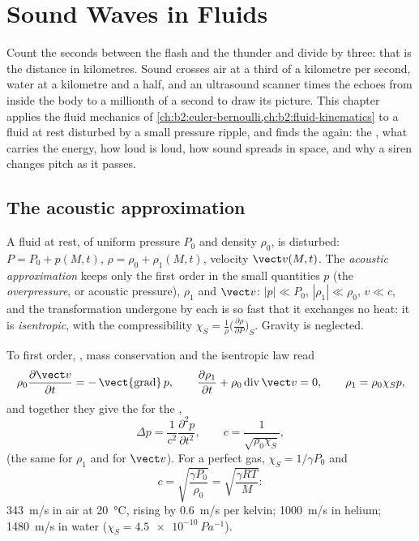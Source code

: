 \chapter{Sound Waves in Fluids}\label{ch:b2:sound-waves}

Count the seconds between the flash and the thunder and divide by
three: that is the distance in kilometres. Sound crosses air at a
third of a kilometre per second, water at a kilometre and a half, and
an ultrasound scanner times the echoes from inside the body to a
millionth of a second to draw its picture. This chapter applies the
fluid mechanics of \cref{ch:b2:euler-bernoulli,ch:b2:fluid-kinematics}
to a fluid at rest disturbed by a small pressure ripple, and finds the
 again: the , what carries the
energy, how loud is loud, how sound spreads in space, and why a siren
changes pitch as it passes.

\section{The acoustic approximation}

\begin{definition}\label{def:b2:sound-waves:approximation}
A fluid at rest, of uniform pressure $P_0$ and density $\rho_0$, is
disturbed: $P = P_0 + p(M, t)$, $\rho = \rho_0 + \rho_1(M, t)$, velocity
$\vect v(M, t)$. The \emph{acoustic approximation} keeps only the first
order in the small quantities $p$ (the \emph{overpressure}, or acoustic
pressure), $\rho_1$ and $\vect v$: $|p| \ll P_0$, $|\rho_1| \ll \rho_0$, $v \ll c$,
and the transformation undergone by each  is so fast
that it exchanges no heat: it is \emph{isentropic}, with the
compressibility $\chi_S = \frac1\rho\bigl(\frac{\partial\rho}{\partial P}\bigr)_S$.
Gravity is neglected.
\end{definition}

\begin{theorem}\label{thm:b2:sound-waves:equation}
To first order, , mass conservation and the isentropic
law read
\[
\rho_0\frac{\partial\vect v}{\partial t} = -\operatorname{\vect{grad}}p , \qquad
\frac{\partial\rho_1}{\partial t} + \rho_0\operatorname{div}\vect v = 0 , \qquad
\rho_1 = \rho_0\chi_Sp ,
\]
and together they give the  for the ,
\[
\Delta p = \frac1{c^2}\frac{\partial^2p}{\partial t^2} , \qquad
c = \frac1{\sqrt{\rho_0\chi_S}} ,
\]
(the same for $\rho_1$ and for $\vect v$). For a perfect gas, $\chi_S =
1/\gamma P_0$ and
\[
c = \sqrt{\frac{\gamma P_0}{\rho_0}} = \sqrt{\frac{\gamma RT}{M}} :
\]
\qty{343}{m/s} in air at \qty{20}{\degreeCelsius}, rising by \qty{0.6}{m/s}
per kelvin; \qty{1000}{m/s} in helium; \qty{1480}{m/s} in water ($\chi_S =
\qty{4.5e-10}{Pa^{-1}}$).
\end{theorem}

